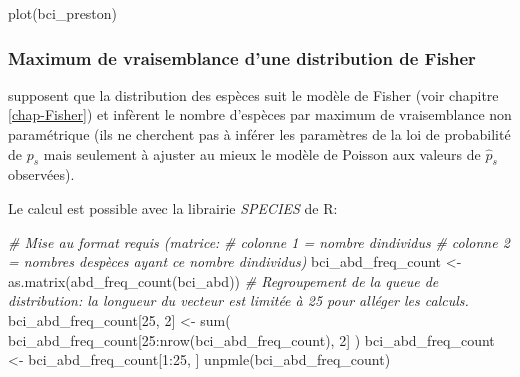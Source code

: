 \documentclass[
  11pt,
  american,
  a4paper,
  extrafontsizes,onecolumn,openright
  ]{memoir}
\newenvironment{Shaded}{\begin{snugshade}}{\end{snugshade}}
\newcommand{\CommentTok}[1]{\textcolor[rgb]{0.56,0.35,0.01}{\textit{#1}}}
\newcommand{\DecValTok}[1]{\textcolor[rgb]{0.00,0.00,0.81}{#1}}
\newcommand{\FunctionTok}[1]{\textcolor[rgb]{0.00,0.00,0.00}{#1}}
\newcommand{\NormalTok}[1]{#1}
\newcommand{\OtherTok}[1]{\textcolor[rgb]{0.56,0.35,0.01}{#1}}
\newcommand{\SpecialCharTok}[1]{\textcolor[rgb]{0.00,0.00,0.00}{#1}}
\begin{document}
\begin{Shaded}
\begin{Highlighting}[]
\FunctionTok{plot}\NormalTok{(bci\_preston)}
\end{Highlighting}
\end{Shaded}

\normalsize

\hypertarget{maximum-de-vraisemblance-dune-distribution-de-fisher}{%
\subsubsection{Maximum de vraisemblance d'une distribution de Fisher}\label{maximum-de-vraisemblance-dune-distribution-de-fisher}}

\textcite{Norris1998} supposent que la distribution des espèces suit le modèle de Fisher (voir chapitre \ref{chap-Fisher}) et infèrent le nombre d'espèces par maximum de vraisemblance non paramétrique (ils ne cherchent pas à inférer les paramètres de la loi de probabilité de \(p_s\) mais seulement à ajuster au mieux le modèle de Poisson aux valeurs de \({\hat{p}}_s\) observées).

Le calcul est possible avec la librairie \emph{SPECIES} de R:

\scriptsize

\begin{Shaded}
\begin{Highlighting}[]
\CommentTok{\# Mise au format requis (matrice:}
\CommentTok{\# colonne 1 = nombre d\textquotesingle{}individus}
\CommentTok{\# colonne 2 = nombres d\textquotesingle{}espèces ayant ce nombre d\textquotesingle{}individus)}
\NormalTok{bci\_abd\_freq\_count }\OtherTok{\textless{}{-}} \FunctionTok{as.matrix}\NormalTok{(}\FunctionTok{abd\_freq\_count}\NormalTok{(bci\_abd))}
\CommentTok{\# Regroupement de la queue de distribution: la longueur du vecteur est limitée à 25 pour alléger les calculs.}
\NormalTok{bci\_abd\_freq\_count[}\DecValTok{25}\NormalTok{, }\DecValTok{2}\NormalTok{] }\OtherTok{\textless{}{-}} \FunctionTok{sum}\NormalTok{(}
\NormalTok{  bci\_abd\_freq\_count[}\DecValTok{25}\SpecialCharTok{:}\FunctionTok{nrow}\NormalTok{(bci\_abd\_freq\_count), }\DecValTok{2}\NormalTok{]}
\NormalTok{)}
\NormalTok{bci\_abd\_freq\_count }\OtherTok{\textless{}{-}}\NormalTok{ bci\_abd\_freq\_count[}\DecValTok{1}\SpecialCharTok{:}\DecValTok{25}\NormalTok{, ]}
\FunctionTok{unpmle}\NormalTok{(bci\_abd\_freq\_count)}
\end{Highlighting}
\end{Shaded}
\end{document}
